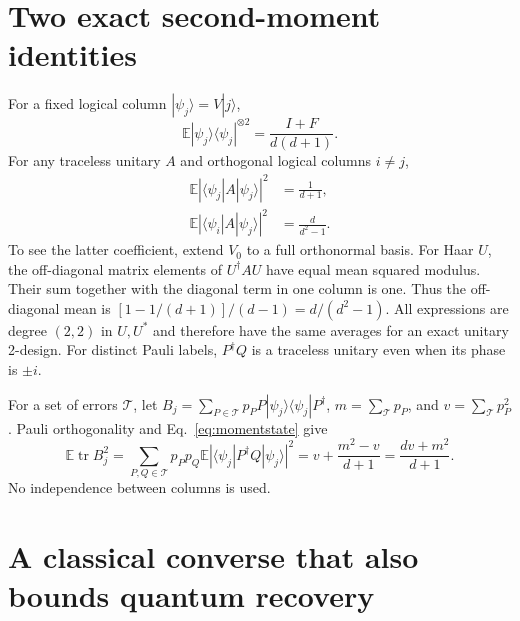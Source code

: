 \documentclass[aps,prl,onecolumn,superscriptaddress,amsmath,amssymb]{revtex4-2}
\newcommand{\E}{\mathbb E}
\newcommand{\tr}{\operatorname{tr}}
\begin{document}
\section{Two exact second-moment identities}

For a fixed logical column $|\psi_j\rangle=V|j\rangle$,
\begin{equation}
\E|\psi_j\rangle\langle\psi_j|^{\otimes2}=\frac{I+F}{d(d+1)}.
\label{eq:momentstate}
\end{equation}
For any traceless unitary $A$ and orthogonal logical columns $i\ne j$,
\begin{align}
\E|\langle\psi_j|A|\psi_j\rangle|^2&=\frac1{d+1},\\
\E|\langle\psi_i|A|\psi_j\rangle|^2&=\frac d{d^2-1}.
\label{eq:crossmoment}
\end{align}
To see the latter coefficient, extend $V_0$ to a full orthonormal basis. For Haar $U$, the off-diagonal matrix elements of $U^\dagger A U$ have equal mean squared modulus. Their sum together with the diagonal term in one column is one. Thus the off-diagonal mean is $[1-1/(d+1)]/(d-1)=d/(d^2-1)$. All expressions are degree $(2,2)$ in $U,U^*$ and therefore have the same averages for an exact unitary 2-design. For distinct Pauli labels, $P^\dagger Q$ is a traceless unitary even when its phase is $\pm i$.

For a set of errors $\mathcal T$, let $B_j=\sum_{P\in\mathcal T}p_PP|\psi_j\rangle\langle\psi_j|P^\dagger$, $m=\sum_{\mathcal T}p_P$, and $v=\sum_{\mathcal T}p_P^2$. Pauli orthogonality and Eq.~\eqref{eq:momentstate} give
\begin{equation}
\E\tr B_j^2=\sum_{P,Q\in\mathcal T}p_Pp_Q\E|\langle\psi_j|P^\dagger Q|\psi_j\rangle|^2
=v+\frac{m^2-v}{d+1}=\frac{dv+m^2}{d+1}.
\label{eq:tailmoment}
\end{equation}
No independence between columns is used.

\section{A classical converse that also bounds quantum recovery}
\end{document}
